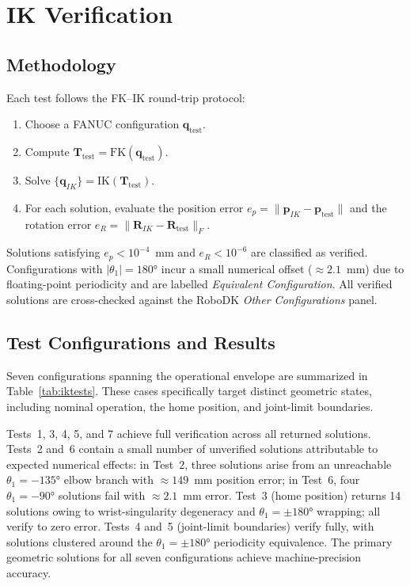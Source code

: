 \documentclass[conference]{IEEEtran}
\begin{document}
\section{IK Verification}
\label{sec:ikverify}

\subsection{Methodology}
Each test follows the FK--IK round-trip protocol:
\begin{enumerate}
\item Choose a FANUC configuration $\mathbf{q}_{\mathrm{test}}$.
\item Compute $\mathbf{T}_{\mathrm{test}} = \mathrm{FK}(\mathbf{q}_{\mathrm{test}})$.
\item Solve $\{\mathbf{q}_{IK}\} = \mathrm{IK}(\mathbf{T}_{\mathrm{test}})$.
\item For each solution, evaluate the position error $e_p = \|\mathbf{p}_{IK} - \mathbf{p}_{\mathrm{test}}\|$ and the rotation error $e_R = \|\mathbf{R}_{IK} - \mathbf{R}_{\mathrm{test}}\|_F$.
\end{enumerate}
Solutions satisfying $e_p < 10^{-4}$~mm and $e_R < 10^{-6}$ are classified as verified.
Configurations with $|\theta_1|=180°$ incur a small numerical offset ($\approx 2.1$~mm) due to floating-point periodicity and are labelled \emph{Equivalent Configuration}.
All verified solutions are cross-checked against the RoboDK \emph{Other Configurations} panel.

\subsection{Test Configurations and Results}
Seven configurations spanning the operational envelope are summarized in Table~\ref{tab:iktests}.
These cases specifically target distinct geometric states, including nominal operation, the home position, and joint-limit boundaries.

Tests~1, 3, 4, 5, and 7 achieve full verification across all returned solutions.
Tests~2 and~6 contain a small number of unverified solutions attributable to expected numerical effects: in Test~2, three solutions arise from an unreachable $\theta_1 = -135°$ elbow branch with $\approx149$~mm position error; in Test~6, four $\theta_1 = -90°$ solutions fail with $\approx2.1$~mm error.
Test~3 (home position) returns 14 solutions owing to wrist-singularity degeneracy and $\theta_1=\pm180°$ wrapping; all verify to zero error.
Tests~4 and~5 (joint-limit boundaries) verify fully, with solutions clustered around the $\theta_1=\pm180°$ periodicity equivalence.
The primary geometric solutions for all seven configurations achieve machine-precision accuracy.
\end{document}
